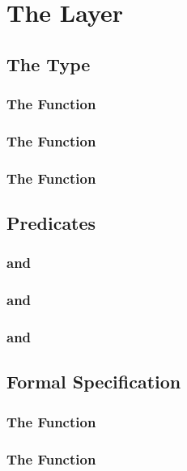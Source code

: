 

\chapter{The  Layer}

\section{The Type \bitstream}
\subsection{The Function \bitstreamread}
\subsection{The Function }
\subsection{The Function }

\section{Predicates}
\subsection{ and }
\subsection{ and }
\subsection{ and }
\subsection{}

\section{Formal Specification}
\subsection{The Function \bitstreamread}
\subsection{The Function }
